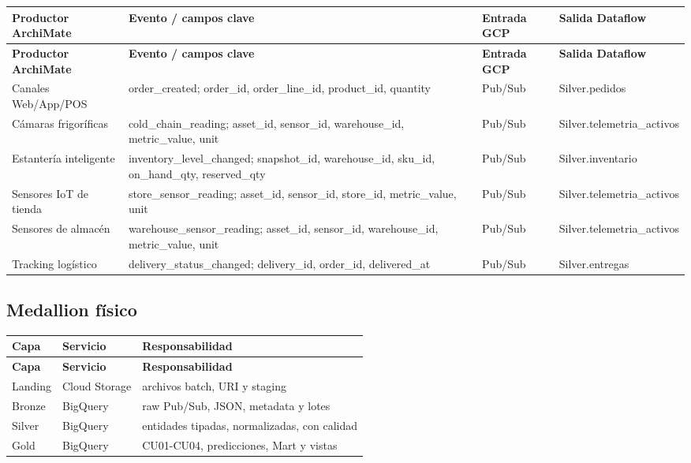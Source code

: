 \documentclass[11pt]{article}
\begin{document}
\begingroup\small
\begin{longtable}{@{}>{\raggedright\arraybackslash}p{}>{\raggedright\arraybackslash}p{}>{\raggedright\arraybackslash}p{}>{\raggedright\arraybackslash}p{}@{}}
\toprule
\textbf{Productor ArchiMate} & \textbf{Evento / campos clave} & \textbf{Entrada GCP} & \textbf{Salida Dataflow} \\
\midrule
\endfirsthead
\toprule
\textbf{Productor ArchiMate} & \textbf{Evento / campos clave} & \textbf{Entrada GCP} & \textbf{Salida Dataflow} \\
\midrule
\endhead
Canales Web/App/POS & order\_created; order\_id, order\_line\_id, product\_id, quantity & Pub/Sub & Silver.pedidos \\
Cámaras frigoríficas & cold\_\allowbreak{}chain\_\allowbreak{}reading; asset\_id, sensor\_id, warehouse\_id, metric\_value, unit & Pub/Sub & Silver.telemetria\_\allowbreak{}activos \\
Estantería inteligente & inventory\_\allowbreak{}level\_\allowbreak{}changed; snapshot\_id, warehouse\_id, sku\_id, on\_hand\_qty, reserved\_qty & Pub/Sub & Silver.inventario \\
Sensores IoT de tienda & store\_\allowbreak{}sensor\_\allowbreak{}reading; asset\_id, sensor\_id, store\_id, metric\_value, unit & Pub/Sub & Silver.telemetria\_\allowbreak{}activos \\
Sensores de almacén & warehouse\_\allowbreak{}sensor\_\allowbreak{}reading; asset\_id, sensor\_id, warehouse\_id, metric\_value, unit & Pub/Sub & Silver.telemetria\_\allowbreak{}activos \\
Tracking logístico & delivery\_\allowbreak{}status\_\allowbreak{}changed; delivery\_id, order\_id, delivered\_at & Pub/Sub & Silver.entregas \\
\bottomrule
\end{longtable}
\endgroup
\par

\subsection{Medallion físico}

\begingroup\small
\begin{longtable}{@{}>{\raggedright\arraybackslash}p{}>{\raggedright\arraybackslash}p{}>{\raggedright\arraybackslash}p{}@{}}
\toprule
\textbf{Capa} & \textbf{Servicio} & \textbf{Responsabilidad} \\
\midrule
\endfirsthead
\toprule
\textbf{Capa} & \textbf{Servicio} & \textbf{Responsabilidad} \\
\midrule
\endhead
Landing & Cloud Storage & archivos batch, URI y staging \\
Bronze & BigQuery & raw Pub/\allowbreak{}Sub, JSON, metadata y lotes \\
Silver & BigQuery & entidades tipadas, normalizadas, con calidad \\
Gold & BigQuery & CU01-CU04, predicciones, Mart y vistas \\
\bottomrule
\end{longtable}
\endgroup
\end{document}
